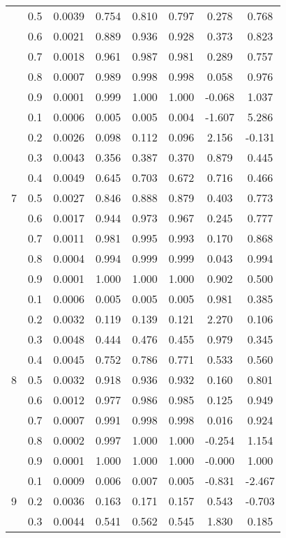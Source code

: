 \documentclass[11pt,a4paper]{report}
\begin{document}
\begin{longtable}{ | c | c || c | c | c | c | c | c | }
 & 0.5 & 0.0039 & 0.754 & 0.810 & 0.797 & 0.278 & 0.768 \\
 & 0.6 & 0.0021 & 0.889 & 0.936 & 0.928 & 0.373 & 0.823 \\
 & 0.7 & 0.0018 & 0.961 & 0.987 & 0.981 & 0.289 & 0.757 \\
 & 0.8 & 0.0007 & 0.989 & 0.998 & 0.998 & 0.058 & 0.976 \\
 & 0.9 & 0.0001 & 0.999 & 1.000 & 1.000 & -0.068 & 1.037 \\
 \hline
\multirow{9}{*}{7} & 0.1 & 0.0006 & 0.005 & 0.005 & 0.004 & -1.607 & 5.286 \\
 & 0.2 & 0.0026 & 0.098 & 0.112 & 0.096 & 2.156 & -0.131 \\
 & 0.3 & 0.0043 & 0.356 & 0.387 & 0.370 & 0.879 & 0.445 \\
 & 0.4 & 0.0049 & 0.645 & 0.703 & 0.672 & 0.716 & 0.466 \\
 & 0.5 & 0.0027 & 0.846 & 0.888 & 0.879 & 0.403 & 0.773 \\
 & 0.6 & 0.0017 & 0.944 & 0.973 & 0.967 & 0.245 & 0.777 \\
 & 0.7 & 0.0011 & 0.981 & 0.995 & 0.993 & 0.170 & 0.868 \\
 & 0.8 & 0.0004 & 0.994 & 0.999 & 0.999 & 0.043 & 0.994 \\
 & 0.9 & 0.0001 & 1.000 & 1.000 & 1.000 & 0.902 & 0.500 \\
 \hline
\multirow{9}{*}{8} & 0.1 & 0.0006 & 0.005 & 0.005 & 0.005 & 0.981 & 0.385 \\
 & 0.2 & 0.0032 & 0.119 & 0.139 & 0.121 & 2.270 & 0.106 \\
 & 0.3 & 0.0048 & 0.444 & 0.476 & 0.455 & 0.979 & 0.345 \\
 & 0.4 & 0.0045 & 0.752 & 0.786 & 0.771 & 0.533 & 0.560 \\
 & 0.5 & 0.0032 & 0.918 & 0.936 & 0.932 & 0.160 & 0.801 \\
 & 0.6 & 0.0012 & 0.977 & 0.986 & 0.985 & 0.125 & 0.949 \\
 & 0.7 & 0.0007 & 0.991 & 0.998 & 0.998 & 0.016 & 0.924 \\
 & 0.8 & 0.0002 & 0.997 & 1.000 & 1.000 & -0.254 & 1.154 \\
 & 0.9 & 0.0001 & 1.000 & 1.000 & 1.000 & -0.000 & 1.000 \\
 \hline
\multirow{9}{*}{9} & 0.1 & 0.0009 & 0.006 & 0.007 & 0.005 & -0.831 & -2.467 \\
 & 0.2 & 0.0036 & 0.163 & 0.171 & 0.157 & 0.543 & -0.703 \\
 & 0.3 & 0.0044 & 0.541 & 0.562 & 0.545 & 1.830 & 0.185 \\

\end{longtable}
\end{document}
